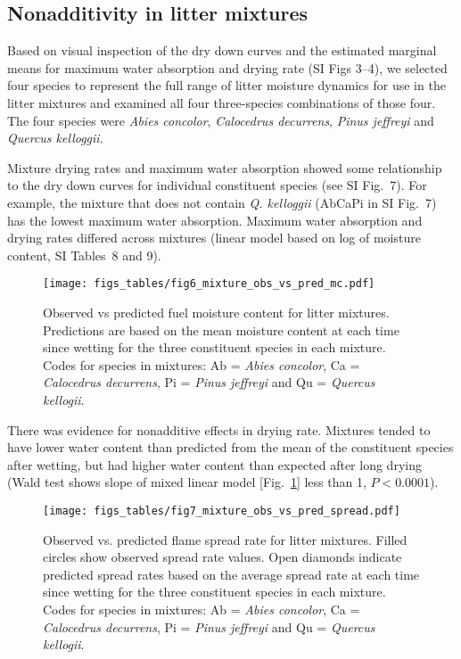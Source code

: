 \documentclass[letterpaper,12pt]{article}
\begin{document}
\subsection*{Nonadditivity in  litter mixtures}

Based on visual inspection of the dry down curves and the estimated marginal
means for maximum water absorption and drying rate (SI Figs 3--4), we selected
four species to represent the full range of litter moisture dynamics for use in
the litter mixtures and examined all four three-species combinations of those
four. The four species were \emph{Abies concolor}, \emph{Calocedrus decurrens},
\emph{Pinus jeffreyi} and \emph{Quercus kelloggii}.

Mixture drying rates and maximum water absorption showed some relationship to
the dry down curves for individual constituent species (see SI Fig.~7). For
example, the mixture that does not contain \emph{Q. kelloggii} (AbCaPi in SI
Fig.~7) has the lowest maximum water absorption. Maximum water absorption and
drying rates differed across mixtures (linear model based on log of moisture
content, SI Tables~8 and 9).


\begin{figure}[h]
  \centering
\texttt{[image: figs\_tables/fig6\_mixture\_obs\_vs\_pred\_mc.pdf]}
\caption{Observed vs predicted fuel moisture content for litter mixtures.
  Predictions are based on the mean moisture content at each time since wetting
  for the three constituent species in each mixture. Codes for species in
  mixtures: Ab = \emph{Abies concolor}, Ca = \emph{Calocedrus decurrens}, Pi =
  \emph{Pinus jeffreyi} and Qu = \emph{Quercus kellogii}.}
  \label{fig:mixture_obs_pred_mc}
\end{figure}


There was evidence for nonadditive effects in drying rate. Mixtures tended to
have lower water content than predicted from the mean of the constituent
species after wetting, but had higher water content than expected after long
drying (Wald test shows slope of mixed linear model
[Fig.~\ref{fig:mixture_obs_pred_mc}] less than 1, $P < 0.0001$).


\begin{figure}[h]
  \centering
\texttt{[image: figs\_tables/fig7\_mixture\_obs\_vs\_pred\_spread.pdf]}
\caption{Observed vs. predicted flame spread rate for litter mixtures. Filled
  circles show observed spread rate values. Open diamonds indicate predicted
  spread rates based on the average spread rate at each time since wetting for
  the three constituent species in each mixture. Codes for species in mixtures:
  Ab = \emph{Abies concolor}, Ca = \emph{Calocedrus decurrens}, Pi =
  \emph{Pinus jeffreyi} and Qu = \emph{Quercus kellogii}.}
  \label{fig:mixture_obs_pred_spread}
\end{figure}
\end{document}
